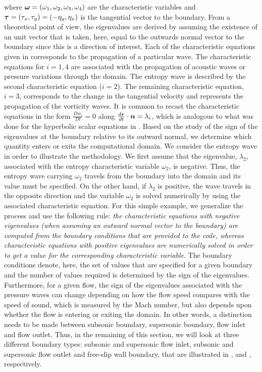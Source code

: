 %
where $\boldsymbol\omega = \left( \omega_1, \omega_2, \omega_3, \omega_4 \right)$ are the characteristic variables and $\boldsymbol\tau = \left( \tau_x, \tau_y \right) = \left( -\eta_y, \eta_x \right)$ is the tangential vector to the boundary. From a theoretical point of view, the eigenvalues are derived by assuming the existence of an unit vector that is taken, here, equal to the outwards normal vector to the boundary since this is a direction of interest. Each of the characteristic equations given in  corresponds to the propagation of a particular wave. The characteristic equations for $i=1,4$ are associated with the propagation of acoustic waves or pressure variations through the domain. The entropy wave is described by the second characteristic equation ($i=2$). The remaining characteristic equation, $i=3$, corresponds to the change in the tangential velocity and represents the propagation of the vorticity waves. It is common to recast the characteristic equations in the form $\frac{D w_i}{Dt} = 0$ along $\frac{d\boldsymbol r}{dt} \cdot \boldsymbol n = \lambda_i$, which is analogous to what was done for the hyperbolic scalar equations in . Based on the study of the sign of the eigenvalues at the boundary relative to its outward normal, we determine which quantity enters or exits the computational domain. We consider the entropy wave in order to illustrate the methodology. We first assume that the eigenvalue, $\lambda_2$, associated with the entropy characteristic variable $\omega_2$, is negative. Thus, the entropy wave carrying $\omega_2$ travels from the boundary into the domain and its value must be specified. On the other hand, if $\lambda_2$ is positive, the wave travels in the opposite direction and the variable $\omega_2$ is solved numerically by using the associated characteristic equation. For this simple example, we generalize the process and use the following rule: \emph{the characteristic equations with negative eigenvalues (when assuming an outward normal vector to the boundary) are computed from the boundary conditions that are provided to the code, whereas characteristic equations with positive eigenvalues are numerically solved in order to get a value for the corresponding characteristic variable}. The boundary conditions denote, here, the set of values that are specified for a given boundary and the number of values required is determined by the sign of the eigenvalues. Furthermore, for a given flow, the sign of the eigenvalues associated with the pressure waves can change depending on how the flow speed compares with the speed of sound, which is measured by the Mach number, but also depends upon whether the flow is entering or exiting the domain. In other words, a distinction needs to be made between subsonic boundary, supersonic boundary, flow inlet and flow outlet. Thus, in the remaining of this section, we will look at three different boundary types: subsonic and supersonic flow inlet, subsonic and supersonic flow outlet and free-slip wall boundary, that are illustrated in ,  and , respectively.  
